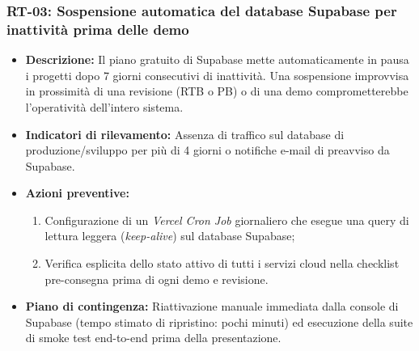 \subsubsection{RT-03: Sospensione automatica del database Supabase per inattività prima delle demo}
\begin{itemize}
    \item \textbf{Descrizione:} Il piano gratuito di Supabase mette automaticamente in pausa i progetti dopo 7 giorni consecutivi di inattività. Una sospensione improvvisa in prossimità di una revisione (RTB o PB) o di una demo comprometterebbe l'operatività dell'intero sistema.
    \item \textbf{Indicatori di rilevamento:} Assenza di traffico sul database di produzione/sviluppo per più di 4 giorni o notifiche e-mail di preavviso da Supabase.
    \item \textbf{Azioni preventive:}
    \begin{enumerate}
        \item Configurazione di un \textit{Vercel Cron Job} giornaliero che esegue una query di lettura leggera (\textit{keep-alive}) sul database Supabase;
        \item Verifica esplicita dello stato attivo di tutti i servizi cloud nella checklist pre-consegna prima di ogni demo e revisione.
    \end{enumerate}
    \item \textbf{Piano di contingenza:} Riattivazione manuale immediata dalla console di Supabase (tempo stimato di ripristino: pochi minuti) ed esecuzione della suite di smoke test end-to-end prima della presentazione.
\end{itemize}

